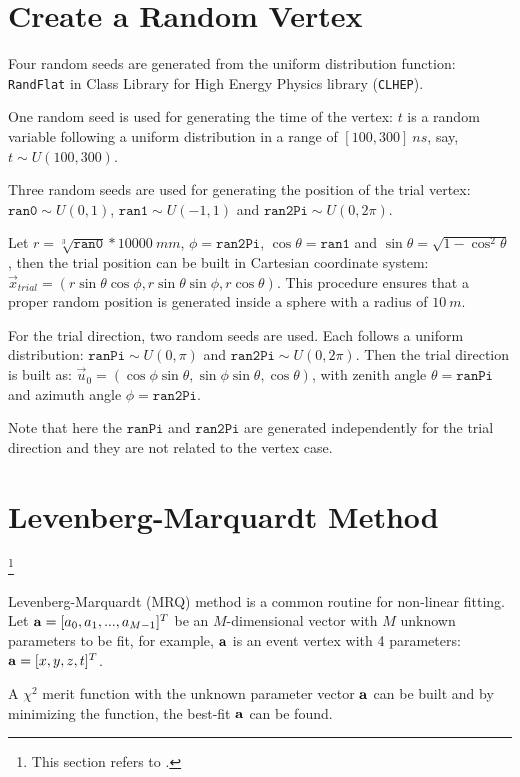 \section{Create a Random Vertex}\label{appendix:random_gen}

Four random seeds are generated from the uniform distribution function: \texttt{RandFlat} in Class Library for High Energy Physics library (\texttt{CLHEP}).

One random seed is used for generating the time of the vertex: $t$ is a random variable following a uniform distribution in a range of $[100, 300]~ns$, say, $t\sim U(100,300)$.

Three random seeds are used for generating the position of the trial vertex: $\texttt{ran0}\sim U(0,1)$, $\texttt{ran1}\sim U(-1,1)$ and $\texttt{ran2Pi}\sim U(0,2\pi)$. 

Let $r=\sqrt[3]{\texttt{ran0}}*10000~mm$, $\phi=\texttt{ran2Pi}$, $\cos\theta=\texttt{ran1}$ and $\sin\theta=\sqrt{1-{\cos^2\theta}}$, then the trial position can be built in Cartesian coordinate system: $\vec{x}_{trial}=(r\sin\theta\cos\phi, r\sin\theta\sin\phi, r\cos\theta)$. This procedure ensures that a proper random position is generated inside a sphere with a radius of $10~m$.

For the trial direction, two random seeds are used. Each follows a uniform distribution: $\texttt{ranPi}\sim U(0,\pi)$ and $\texttt{ran2Pi}\sim U(0,2\pi)$. Then the trial direction is built as: $\vec{u}_{0}=(\cos\phi\sin\theta,\sin\phi\sin\theta,\cos\theta)$, with zenith angle $\theta=\texttt{ranPi}$ and azimuth angle $\phi=\texttt{ran2Pi}$.

Note that here the $\texttt{ranPi}$ and $\texttt{ran2Pi}$ are generated independently for the trial direction and they are not related to the vertex case.

\section{Levenberg-Marquardt Method}\footnote{This section refers to \cite{press2007numerical}.}\label{appendix:MRQ}

Levenberg-Marquardt (MRQ) method is a common routine for non-linear fitting. Let ${\bf a} = [a_0, a_1, ..., a_{M-1}]^T$ be an $M$-dimensional vector with $M$ unknown parameters to be fit, for example, $\bf a$ is an event vertex with 4 parameters: ${\bf a}=[x,y,z,t]^T$.

A $\chi^2$ merit function with the unknown parameter vector $\bf a$ can be built and by minimizing the function, the best-fit $\bf a$ can be found.


